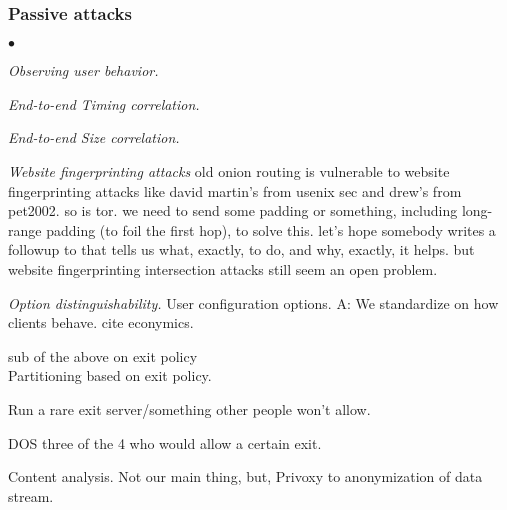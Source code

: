 \documentclass[times,10pt,twocolumn]{article}
\newenvironment{tightlist}{\begin{list}{$\bullet$}{
  \setlength{\itemsep}{0mm}
    \setlength{\parsep}{0mm}
    }}{\end{list}}
\begin{document}
\subsubsection*{Passive attacks}
\begin{tightlist}
\item \emph{Observing user behavior.}
\item \emph{End-to-end Timing correlation.}
\item \emph{End-to-end Size correlation.}
\item \emph{Website fingerprinting attacks} old onion routing is
vulnerable to website fingerprinting attacks like david martin's
from usenix sec and drew's from pet2002. so is tor. we need to send
some padding or something, including long-range padding (to foil the
first hop), to solve this. let's hope somebody writes a followup to
\cite{defensive-dropping} that tells us what, exactly, to do, and why,
exactly, it helps. but website fingerprinting intersection attacks
\cite{kesdogan:pet2002} still seem an open problem.

\item \emph{Option distinguishability.} User configuration options.
A: We standardize on how clients behave. cite econymics.

\item sub of the above on exit policy\\
Partitioning based on exit policy.

Run a rare exit server/something other people won't allow.

DOS three of the 4 who would allow a certain exit.

\item Content analysis. Not our main thing, but, Privoxy to
  anonymization of data stream.


\end{tightlist}
\end{document}
